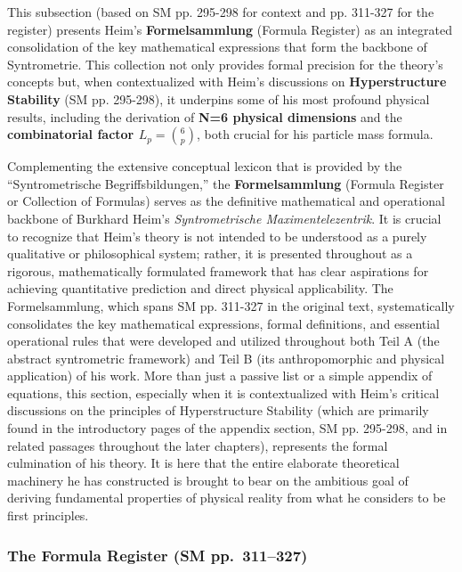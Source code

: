 \documentclass[12pt]{article}
\begin{document}
This subsection (based on SM pp. 295-298 for context and pp. 311-327 for the register) presents Heim's \textbf{Formelsammlung} (Formula Register) as an integrated consolidation of the key mathematical expressions that form the backbone of Syntrometrie. This collection not only provides formal precision for the theory's concepts but, when contextualized with Heim's discussions on \textbf{Hyperstructure Stability} (SM pp. 295-298), it underpins some of his most profound physical results, including the derivation of \textbf{N=6 physical dimensions} and the \textbf{combinatorial factor \(L_p = \binom{6}{p}\)}, both crucial for his particle mass formula.

Complementing the extensive conceptual lexicon that is provided by the \enquote{Syntrometrische Begriffsbildungen,} the \textbf{Formelsammlung} (Formula Register or Collection of Formulas) serves as the definitive mathematical and operational backbone of Burkhard Heim's \textit{Syntrometrische Maximentelezentrik}. It is crucial to recognize that Heim's theory is not intended to be understood as a purely qualitative or philosophical system; rather, it is presented throughout as a rigorous, mathematically formulated framework that has clear aspirations for achieving quantitative prediction and direct physical applicability. The Formelsammlung, which spans SM pp. 311-327 in the original text, systematically consolidates the key mathematical expressions, formal definitions, and essential operational rules that were developed and utilized throughout both Teil A (the abstract syntrometric framework) and Teil B (its anthropomorphic and physical application) of his work. More than just a passive list or a simple appendix of equations, this section, especially when it is contextualized with Heim's critical discussions on the principles of Hyperstructure Stability (which are primarily found in the introductory pages of the appendix section, SM pp. 295-298, and in related passages throughout the later chapters), represents the formal culmination of his theory. It is here that the entire elaborate theoretical machinery he has constructed is brought to bear on the ambitious goal of deriving fundamental properties of physical reality from what he considers to be first principles.

\subsubsection*{The Formula Register (SM pp.\ 311--327)}
\label{sec:formula_register_final}
\end{document}
